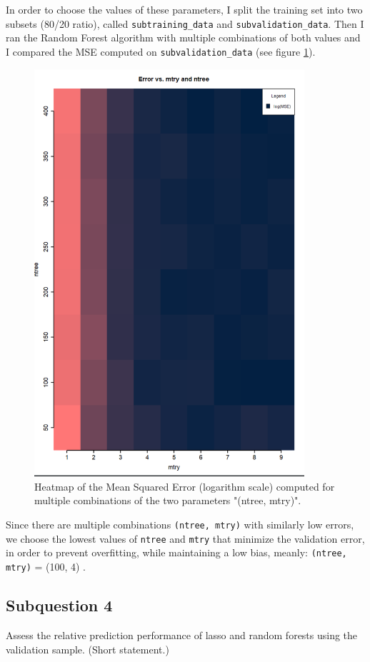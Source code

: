 \documentclass{article}
\begin{document}
	In order to choose the values of these parameters, I split the training set into two subsets (80/20 ratio), called \verb|subtraining_data| and \verb|subvalidation_data|. Then I ran the Random Forest algorithm with multiple combinations of both values and I compared the MSE computed on \verb|subvalidation_data| (see figure \ref{fig:RF_error_vs_mtry_ntree}).
	
	\begin{figure}[H]\centering
		\includegraphics[width=10cm]{RF_error_vs_mtry_ntree}
		\caption{Heatmap of the Mean Squared Error (logarithm scale) computed for multiple combinations of the two parameters "(ntree, mtry)".}
		\label{fig:RF_error_vs_mtry_ntree}
	\end{figure}
	 
	Since there are multiple combinations \verb|(ntree, mtry)| with similarly low errors, we choose the lowest values of \verb|ntree| and \verb|mtry| that minimize the validation error, in order to prevent overfitting, while maintaining a low bias, meanly:
	\verb|(ntree, mtry)| = (100, 4) .
	
	\subsection{Subquestion 4}
	Assess the relative prediction performance of lasso and random forests using the validation sample. (Short statement.)
\end{document}
